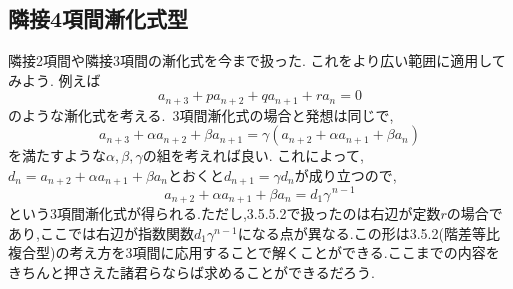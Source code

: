 \subsection{隣接4項間漸化式型}
隣接2項間や隣接3項間の漸化式を今まで扱った.
これをより広い範囲に適用してみよう.
例えば
\[
  a_{n+3}+pa_{n+2}+qa_{n+1}+ra_n=0
\]
のような漸化式を考える.
\,3項間漸化式の場合と発想は同じで,
\[
  a_{n+3}+\alpha a_{n+2}+\beta a_{n+1}=\gamma \left(a_{n+2}+\alpha a_{n+1}+\beta a_{n}\right)
\]
を満たすような$\alpha,\beta,\gamma$の組を考えれば良い.
これによって,\,$d_n=a_{n+2}+\alpha a_{n+1}+\beta a_n$とおくと$d_{n+1}=\gamma d_n$が成り立つので,
\[
  a_{n+2}+\alpha a_{n+1}+\beta a_n=d_1\gamma^{\,n-1}
\]
という3項間漸化式が得られる.ただし,3.5.5.2で扱ったのは右辺が定数$r$の場合であり,ここでは右辺が指数関数$d_1\gamma^{n-1}$になる点が異なる.この形は3.5.2(階差等比複合型)の考え方を3項間に応用することで解くことができる.ここまでの内容をきちんと押さえた諸君らならば求めることができるだろう.